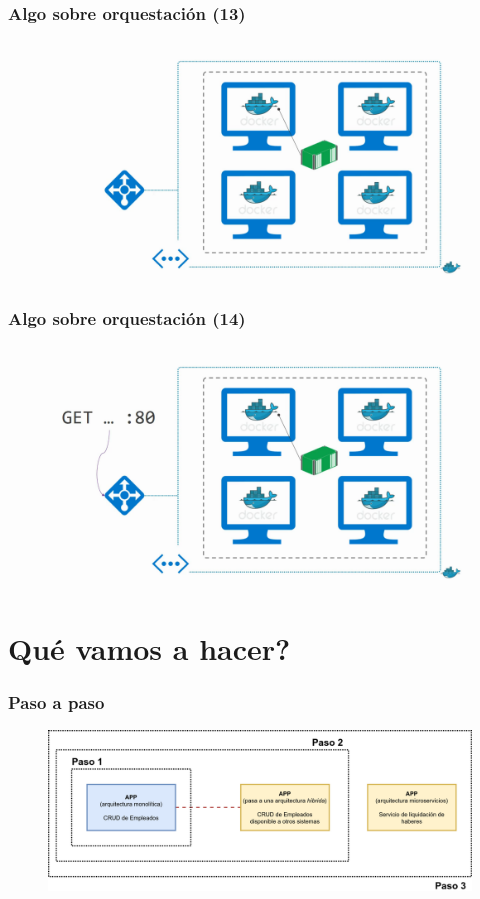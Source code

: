 \documentclass{beamer}
\begin{document}
\begin{frame}
  \frametitle{Algo sobre orquestación (13)}
	\begin{figure}[htp]
	\centering
	\includegraphics[width=0.95\linewidth]{img/orquestacion_13.png}
	\end{figure}
\end{frame}

\begin{frame}
  \frametitle{Algo sobre orquestación (14)}
	\begin{figure}[htp]
	\centering
	\includegraphics[width=0.95\linewidth]{img/orquestacion_14.png}
	\end{figure}
\end{frame}

\section{Qué vamos a hacer?}

\begin{frame}
  	\frametitle{Paso a paso}
	\begin{figure}[htp]
	\centering
	\includegraphics[width=0.95\linewidth]{img/paso-a-paso.png}
	\end{figure}
\end{frame}
\end{document}
